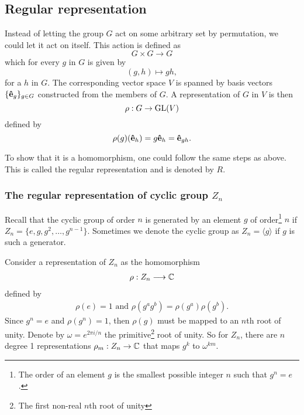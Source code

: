 \subsection{Regular representation}

	Instead of letting the group $G$ act on some arbitrary set by permutation, we could let it act on itself. This action is defined as
	\[
	G \times G \rightarrow G
	\]
	which for every $g$ in $G$ is given by 
	\[
	(g,h) \mapsto gh,
	\]
	for a $h$ in $G$. The corresponding vector space $V$ is spanned by basis vectors $\{\mathbf{\hat{e}}_g\}_{g \in G}$ constructed from the members of $G$. A representation of $G$ in $V$ is then
	\[
	\rho: G \rightarrow \text{GL}(V)
	\]
	defined by
	\[
	\rho(g)(\mathbf{\hat{e}}_h) = g\mathbf{\hat{e}}_h = \mathbf{\hat{e}}_{gh}.
	\]
	
	To show that it is a homomorphism, one could follow the same steps as above. This is called the regular representation and is denoted by $R$.
	
	\subsubsection{The regular representation of cyclic group $Z_n$}
	
		Recall that the cyclic group of order $n$ is generated by an element $g$ of order\footnote{The order of an element $g$ is the smallest possible integer $n$ such that $g^n = e$.} $n$ if $Z_n = \{e, g, g^2, \dots, g^{n-1} \}$. Sometimes we denote the cyclic group as $Z_n = \langle g \rangle$ if $g$ is such a generator. %
		
		Consider a representation of $Z_n$ as the homomorphism
		\begin{align}
		\rho: Z_n \longrightarrow \mathbb{C}
		\end{align}
		defined by 
		\begin{align}
			\rho(e) = 1 \text{ and } \rho(g^a g^b) = \rho(g^a)\rho(g^b).
		\end{align}
		Since $g^n = e$ and $\rho(g^n) = 1$, then $\rho(g)$ must be mapped to an $n$th root of unity. Denote by $\omega = e^{2\pi i/n}$ the primitive\footnote{The first non-real $n$th root of unity} root of unity. So for $Z_n$, there are $n$ degree 1 representations $\rho_m: Z_n \rightarrow \mathbb{C}$ that maps $g^k$ to $\omega^{km}$.
		
